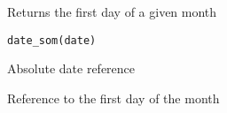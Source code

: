 %
\begin{Description}\relax
Returns the first day of a given month
\end{Description}
%
\begin{Usage}
\begin{verbatim}
date_som(date)
\end{verbatim}
\end{Usage}
%
\begin{Arguments}
\begin{ldescription}
\item[\code{date}] 
Absolute date reference

\end{ldescription}
\end{Arguments}
%
\begin{Value}
Reference to the first day of the month
\end{Value}
